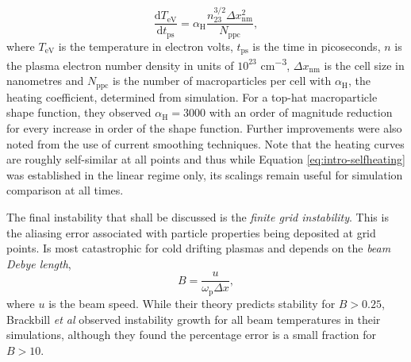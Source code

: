 \begin{equation}\label{eq:intro-selfheating}
	\frac{\mathrm{d} T_\mathrm{eV}}{\mathrm{d}t_\mathrm{ps}} = \alpha_\mathrm{H} \frac{n^{3/2}_{23} \Delta x^2_\mathrm{nm}}{N_\mathrm{ppc}},
\end{equation}
where $T_\mathrm{eV}$ is the temperature in electron volts, $t_\mathrm{ps}$ is the time in picoseconds, $n$ is the plasma electron number density in units of $10^{23}$ \unit{cm^{-3}}, $\Delta x_\mathrm{nm}$ is the cell size in nanometres and $N_\mathrm{ppc}$ is the number of macroparticles per cell with $\alpha_\mathrm{H}$, the heating coefficient, determined from simulation. For a top-hat macroparticle shape function, they observed $\alpha_\mathrm{H} = 3000$ with an order of magnitude reduction for every increase in order of the shape function. Further improvements were also noted from the use of current smoothing techniques. Note that the heating curves are roughly self-similar at all points and thus while Equation \ref{eq:intro-selfheating} was established in the linear regime only, its scalings remain useful for simulation comparison at all times.

The final instability that shall be discussed is the \textit{finite grid instability}. This is the aliasing error associated with particle properties being deposited at grid points. Is most catastrophic for cold drifting plasmas and depends on the \textit{beam Debye length},
\begin{equation}
	B = \frac{u}{\omega_\mathrm{p} \Delta x},
\end{equation}
where $u$ is the beam speed. While their theory predicts stability for $B > 0.25$, Brackbill \textit{et al} \cite{brackbillEnergyMomentumConservation2016} observed instability growth for all beam temperatures in their simulations, although they found the percentage error is a small fraction for $B>10$.

